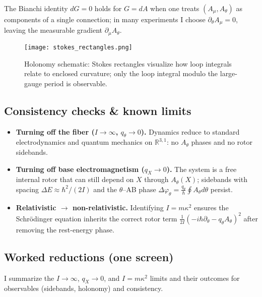 The Bianchi identity $dG=0$ holds for $G=dA$ when one treats $(A_\mu, A_\theta)$ as components of a single connection; in many experiments I choose $\partial_\theta A_\mu=0$, leaving the measurable gradient $\partial_\mu A_\theta$.

\begin{figure}[h]
  \centering
  \texttt{[image: stokes\_rectangles.png]}
  \caption{Holonomy schematic: Stokes rectangles visualize how loop integrals relate to enclosed curvature; only the loop integral modulo the large-gauge period is observable.}
  \label{fig:stokes}
\end{figure}

\subsection{Consistency checks \& known limits}\label{sec:consistency-checks}
\begin{itemize}
  \item \textbf{Turning off the fiber ($I\to\infty$, $q_\theta\to 0$).} Dynamics reduce to standard electrodynamics and quantum mechanics on $\mathbb R^{3,1}$: no $A_\theta$ phases and no rotor sidebands.
  \item \textbf{Turning off base electromagnetism ($q_X\to 0$).} The system is a free internal rotor that can still depend on $X$ through $A_\theta(X)$; sidebands with spacing $\Delta E\approx \hbar^2/(2I)$ and the $\theta$--AB phase $\Delta\varphi_\theta=\tfrac{q_\theta}{\hbar}\oint A_\theta d\theta$ persist.
  \item \textbf{Relativistic $\to$ non-relativistic.} Identifying $I=m\kappa^2$ ensures the Schr\"odinger equation inherits the correct rotor term $\tfrac{1}{2I}(-i\hbar\partial_\theta-q_\theta A_\theta)^2$ after removing the rest-energy phase.
\end{itemize}

\subsection{Worked reductions (one screen)}\label{sec:worked-reductions}
I summarize the $I\to\infty$, $q_X\to 0$, and $I=m\kappa^2$ limits and their outcomes for observables (sidebands, holonomy) and consistency.
